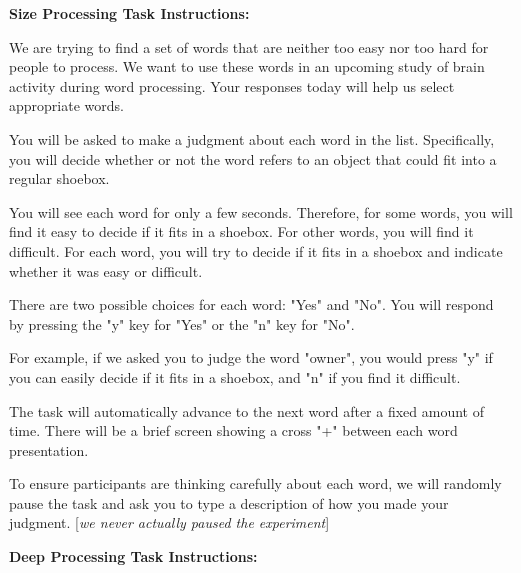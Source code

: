 \textbf{Size Processing Task Instructions:}

\begin{displayquote}


         We are trying to find a set of words that are neither too easy nor too hard for people to process. We want to use these words in an upcoming study of brain activity during word processing. Your responses today will help us select appropriate words.

       You will be asked to make a judgment about each word in the list.
       Specifically, you will decide whether or not the word refers to an object that could
       fit into a regular shoebox.

       You will see each word for only a few seconds. Therefore, for some words, you will find it easy to decide if it fits in a shoebox. For other words, you will find it difficult. For each word, you will try to decide if it fits in a shoebox and indicate whether it was easy or difficult. 

      There are two possible choices for each word: "Yes" and "No". You will respond by pressing
      the "y" key for "Yes" or the "n" key for "No".

      For example, if we asked you to judge the word "owner", you would press "y" if you can easily decide if it fits in a shoebox, and "n" if you find it difficult.

      The task will automatically advance to the next word after a fixed amount of time.
      There will be a brief screen showing a cross "+" between each word presentation.

      To ensure participants are thinking carefully about each word, we will randomly pause the task and ask you to type a description of how you made your judgment. [\emph{we never actually paused the experiment}]

\end{displayquote}






\textbf{Deep Processing Task Instructions:}


